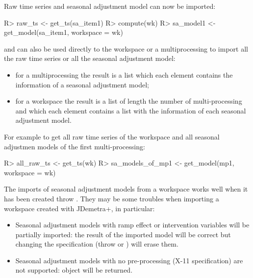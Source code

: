 \documentclass[article]{jss}
\providecommand{\tightlist}{%
  \setlength{\itemsep}{0pt}\setlength{\parskip}{0pt}}
\begin{document}
Raw time series and seasonal adjustment model can now be imported:

\begin{CodeChunk}

\begin{CodeInput}
R> raw_ts <- get_ts(sa_item1)
R> compute(wk)
R> sa_model1 <- get_model(sa_item1, workspace = wk)
\end{CodeInput}
\end{CodeChunk}

 and  can also be used directly to the
workspace or a multiprocessing to import all the raw time series or all
the seasonal adjustment model:

\begin{itemize}
\tightlist
\item
  for a multiprocessing the result is a list which each element contains
  the information of a seasonal adjustment model;\\
\item
  for a workspace the result is a list of length the number of
  multi-processing and which each element contains a list with the
  information of each seasonal adjustment model.
\end{itemize}

For example to get all raw time series of the workspace and all seasonal
adjustmen models of the first multi-processing:

\begin{CodeChunk}

\begin{CodeInput}
R> all_raw_ts <- get_ts(wk)
R> sa_models_of_mp1 <- get_model(mp1, workspace = wk)
\end{CodeInput}
\end{CodeChunk}

The imports of seasonal adjustment models from a workspace works well
when it has been created throw . They may be some
troubles when importing a workspace created with JDemetra+, in
particular:

\begin{itemize}
\tightlist
\item
  Seasonal adjustment models with ramp effect or intervention variables
  will be partially imported: the result of the imported model will be
  correct but changing the specification (throw  or
  ) will erase them.\\
\item
  Seasonal adjustment models with no pre-processing (X-11 specification)
  are not supported:  object will be returned.
\end{itemize}
\end{document}
